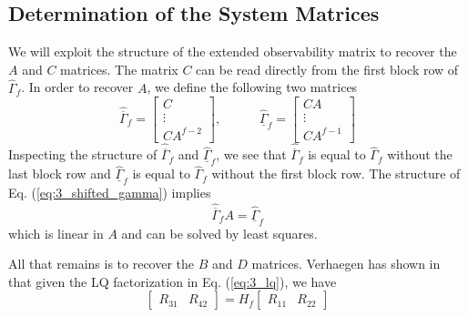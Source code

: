 \subsection{Determination of the System Matrices}
We will exploit the structure of the extended observability matrix to recover the $A$ and $C$ matrices. The matrix $C$ can be read directly from the first block row of $\hat{\Gamma}_f$. In order to recover $A$, we define the following two matrices 
\begin{equation}\label{eq:3_shifted_gamma}
\hat{\overline{\Gamma}}_f = \begin{bmatrix}C\\ \vdots \\ CA^{f-2}\end{bmatrix}, \hspace{3em}
\hat{\underline{\Gamma}}_f = \begin{bmatrix}CA\\ \vdots \\ CA^{f-1}\end{bmatrix}
\end{equation}
Inspecting the structure of $\hat{\overline{\Gamma}}_f$  and $\hat{\underline{\Gamma}}_f$, we see that $\hat{\overline{\Gamma}}_f$ is equal to $\hat{\Gamma}_f$ without the last block row and $\hat{\underline{\Gamma}}_f$ is equal to $\hat{\Gamma}_f$ without the first block row. The structure of Eq. (\ref{eq:3_shifted_gamma}) implies
\begin{equation}
\hat{\overline{\Gamma}}_f A = \hat{\underline{\Gamma}}_f
\end{equation}
which is linear in $A$ and can be solved by least squares.

All that remains is to recover the $B$ and $D$ matrices. Verhaegen has shown in \cite{verhaegen1994identification} that given the LQ factorization in Eq. (\ref{eq:3_lq}), we have
\begin{equation*}
\begin{bmatrix}R_{31} & R_{42}\end{bmatrix} = 
H_f \begin{bmatrix}R_{11} & R_{22}\end{bmatrix}
\end{equation*}

